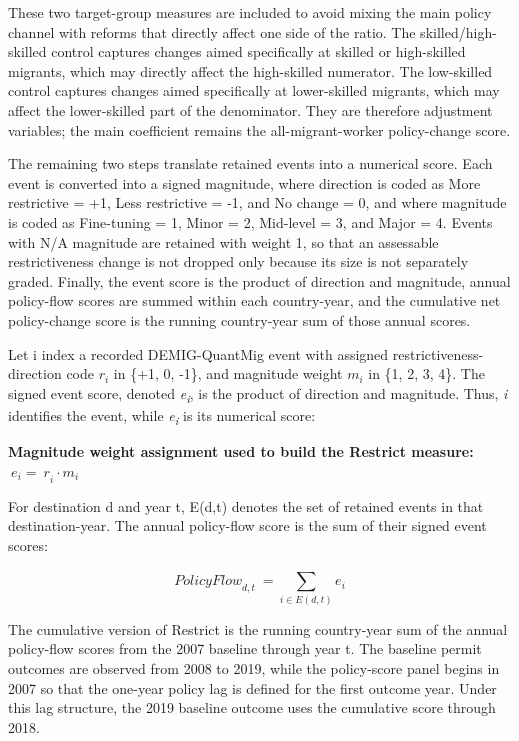 \documentclass[11pt,a4paper]{article}
\begin{document}
These two target-group measures are included to avoid mixing the main
policy channel with reforms that directly affect one side of the ratio.
The skilled/high-skilled control captures changes aimed specifically at
skilled or high-skilled migrants, which may directly affect the
high-skilled numerator. The low-skilled control captures changes aimed
specifically at lower-skilled migrants, which may affect the
lower-skilled part of the denominator. They are therefore adjustment
variables; the main coefficient remains the all-migrant-worker
policy-change score.

The remaining two steps translate retained events into a numerical
score. Each event is converted into a signed magnitude, where direction
is coded as More restrictive = +1, Less restrictive = -1, and No change
= 0, and where magnitude is coded as Fine-tuning = 1, Minor = 2,
Mid-level = 3, and Major = 4. Events with N/A magnitude are retained
with weight 1, so that an assessable restrictiveness change is not
dropped only because its size is not separately graded. Finally, the
event score is the product of direction and magnitude, annual
policy-flow scores are summed within each country-year, and the
cumulative net policy-change score is the running country-year sum of
those annual scores.

Let i index a recorded DEMIG-QuantMig event with assigned
restrictiveness-direction code \(r_{i}\) in \{+1, 0, -1\}, and magnitude
weight \(m_{i}\) in \{1, 2, 3, 4\}. The signed event score, denoted
\emph{e\textsubscript{i}}, is the product of direction and magnitude.
Thus, \emph{i} identifies the event, while \emph{e\textsubscript{i}} is
its numerical score:

\textbf{Magnitude weight assignment used to build the Restrict measure:}
\(\ {e_{i} = \ r}_{i} \cdot m_{i}\)

For destination d and year t, E(d,t) denotes the set of retained events
in that destination-year. The annual policy-flow score is the sum of
their signed event scores:

\[{PolicyFlow}_{d,t}\  = \sum_{i \in E(d,t)}^{}e_{i}\]

The cumulative version of Restrict is the running country-year sum of
the annual policy-flow scores from the 2007 baseline through year t. The
baseline permit outcomes are observed from 2008 to 2019, while the
policy-score panel begins in 2007 so that the one-year policy lag is
defined for the first outcome year. Under this lag structure, the 2019
baseline outcome uses the cumulative score through 2018.
\end{document}
